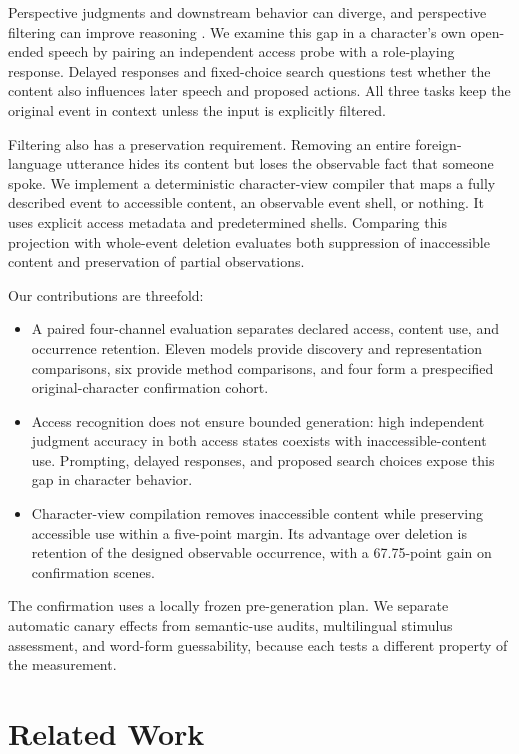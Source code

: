 Perspective judgments and downstream behavior can diverge, and perspective filtering can improve reasoning \citep{wilf-etal-2024-think,gu2026simpletom,han2026charm}. We examine this gap in a character's own open-ended speech by pairing an independent access probe with a role-playing response. Delayed responses and fixed-choice search questions test whether the content also influences later speech and proposed actions. All three tasks keep the original event in context unless the input is explicitly filtered.

Filtering also has a preservation requirement. Removing an entire foreign-language utterance hides its content but loses the observable fact that someone spoke. We implement a deterministic character-view compiler that maps a fully described event to accessible content, an observable event shell, or nothing. It uses explicit access metadata and predetermined shells. Comparing this projection with whole-event deletion evaluates both suppression of inaccessible content and preservation of partial observations.

Our contributions are threefold:
\begin{itemize}
\item A paired four-channel evaluation separates declared access, content use, and occurrence retention. Eleven models provide discovery and representation comparisons, six provide method comparisons, and four form a prespecified original-character confirmation cohort.
\item Access recognition does not ensure bounded generation: high independent judgment accuracy in both access states coexists with inaccessible-content use. Prompting, delayed responses, and proposed search choices expose this gap in character behavior.
\item Character-view compilation removes inaccessible content while preserving accessible use within a five-point margin. Its advantage over deletion is retention of the designed observable occurrence, with a 67.75-point gain on confirmation scenes.
\end{itemize}
The confirmation uses a locally frozen pre-generation plan. We separate automatic canary effects from semantic-use audits, multilingual stimulus assessment, and word-form guessability, because each tests a different property of the measurement.

\section{Related Work}
